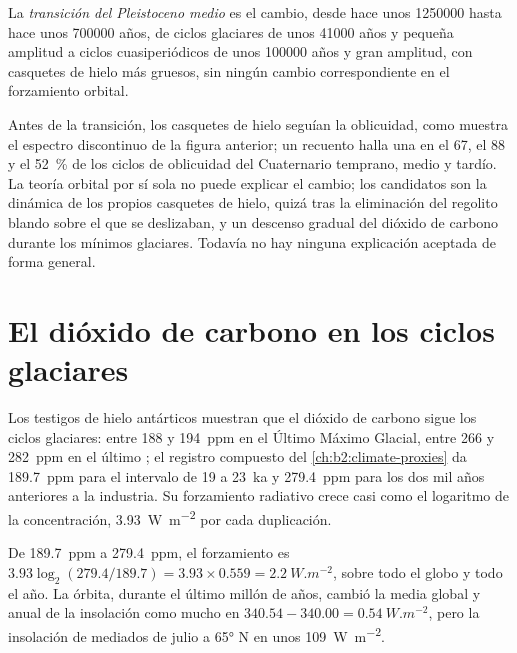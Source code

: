 \begin{definition}\label{def:b2:orbital-forcing:mpt}
La \emph{transición del Pleistoceno medio} es el cambio, desde hace unos
\num{1250000} hasta hace unos \num{700000} años, de ciclos glaciares de unos \num{41000} años y pequeña
amplitud a ciclos cuasiperiódicos de unos \num{100000} años y gran amplitud, con casquetes de hielo más
gruesos, sin ningún cambio correspondiente en el forzamiento orbital.
\end{definition}

Antes de la transición, los casquetes de hielo seguían la oblicuidad, como muestra el espectro discontinuo de la figura
anterior; un recuento halla una  en el 67, el 88 y el \qty{52}{\percent} de los
ciclos de oblicuidad del Cuaternario temprano, medio y tardío. La teoría orbital por sí sola no puede explicar el cambio; los candidatos son la dinámica
de los propios casquetes de hielo, quizá tras la eliminación del regolito blando sobre el que se deslizaban,
y un descenso gradual del dióxido de carbono durante los mínimos glaciares. Todavía no hay ninguna explicación
aceptada de forma general.

\section{El dióxido de carbono en los ciclos glaciares}\label{sec:b2:orbital-forcing:co2}

Los testigos de hielo antárticos muestran que el dióxido de carbono sigue los ciclos glaciares: entre 188 y
\qty{194}{ppm} en el Último Máximo Glacial, entre 266 y \qty{282}{ppm} en el último ;
el registro compuesto del \cref{ch:b2:climate-proxies} da \qty{189.7}{ppm} para el intervalo de 19 a
\qty{23}{ka} y \qty{279.4}{ppm} para los dos mil años anteriores a la industria. Su forzamiento radiativo
crece casi como el logaritmo de la concentración, \qty{3.93}{W.m^{-2}} por cada duplicación.

\begin{example}\label{ex:b2:orbital-forcing:co2}
De \qty{189.7}{ppm} a \qty{279.4}{ppm}, el forzamiento es $3.93\log_2(279.4/189.7) = 3.93 \times
0.559 = \qty{2.2}{W.m^{-2}}$, sobre todo el globo y todo el año. La órbita, durante el último
millón de años, cambió la media global y anual de la insolación como mucho en $340.54 - 340.00 =
\qty{0.54}{W.m^{-2}}$, pero la insolación de mediados de julio a \ang{65} N en unos \qty{109}{W.m^{-2}}.
\end{example}

